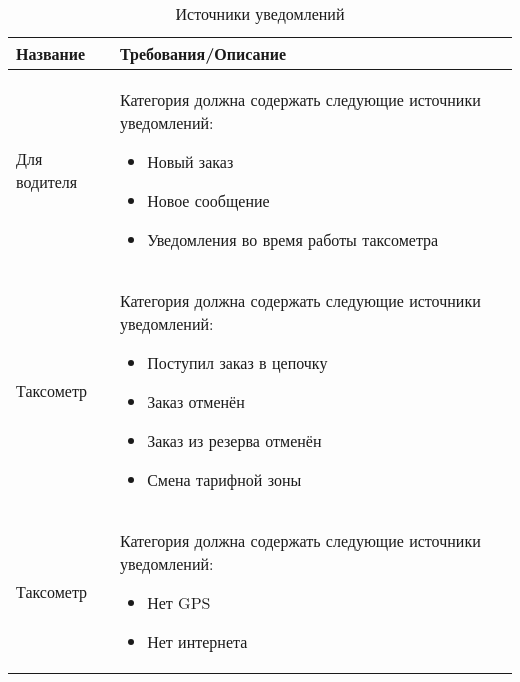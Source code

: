         \begin{table}
        \begin{center}
        \caption{Источники уведомлений}
        \label{options_tab_global_options_notif}
        \setlength{\extrarowheight}{2mm}
        \begin{tabular}{|p{5cm}|p{10cm}|}
           \hline   \textbf{Название}&\textbf{Требования/Описание} \\ [2mm]

           \hline Для водителя & Категория должна содержать следующие источники уведомлений: \begin{itemize} \item{Новый заказ} \item{Новое сообщение} \item{Уведомления во время работы таксометра} \end{itemize}\\ [2mm]

           \hline Таксометр & Категория должна содержать следующие источники уведомлений: \begin{itemize} \item{Поступил заказ в цепочку} \item{Заказ отменён} \item{Заказ из резерва отменён} \item{Смена тарифной зоны} \end{itemize}\\ [2mm]

           \hline Таксометр & Категория должна содержать следующие источники уведомлений: \begin{itemize} \item{Нет GPS} \item{Нет интернета} \end{itemize}\\ [2mm]

           \hline
        \end{tabular}
        \end{center}
      \end{table}